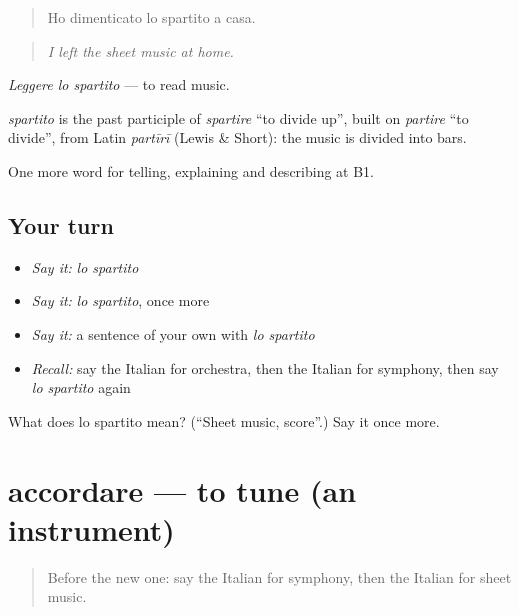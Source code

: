 \begin{quote}
Ho dimenticato lo spartito a casa.
\end{quote}

\begin{quote}
\emph{I left the sheet music at home.}
\end{quote}

\emph{Leggere lo spartito} — to read music.

\begin{cousinweb}
\emph{spartito} is the past participle of \emph{spartire} \textquotedblleft{}to divide up\textquotedblright{}, built on \emph{partire} \textquotedblleft{}to divide\textquotedblright{}, from Latin \emph{partīrī} (Lewis \& Short): the music is divided into bars.
\end{cousinweb}

\begin{grammarlens}[title={What you've built}]
One more word for telling, explaining and describing at B1.
\end{grammarlens}

\subsection*{Your turn}
\begin{itemize}
\raggedright
  \item \emph{Say it:} \emph{lo spartito}
  \item \emph{Say it:} \emph{lo spartito}, once more
  \item \emph{Say it:} a sentence of your own with \emph{lo spartito}
  \item \emph{Recall:} say the Italian for orchestra, then the Italian for symphony, then say \emph{lo spartito} again
\end{itemize}

\begin{tcolorbox}[breakable,colback=teal!4,colframe=teal!35!black,title={Before you move on}]
What does lo spartito mean? (\textquotedblleft{}Sheet music, score\textquotedblright{}.) Say it once more.
\end{tcolorbox}
\section[accordare]{accordare — to tune (an instrument)}

\label{lesson:IT-C517-accordare}



\begin{quote}
Before the new one: say the Italian for symphony, then the Italian for sheet music.
\end{quote}

